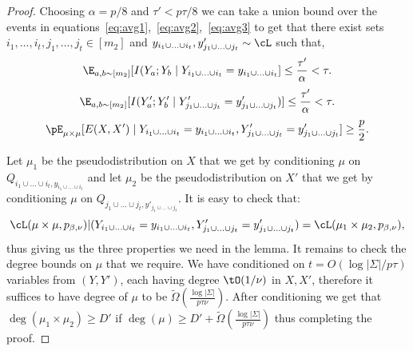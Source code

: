 \begin{proof}
Choosing $\alpha = p/8$ and $\tau' < p\tau/8$ we can take a union bound over the events in equations~\eqref{eq:avg1},~\eqref{eq:avg2},~\eqref{eq:avg3} to get that there exist sets $i_1,\ldots,i_t, j_1,\ldots,j_t \in [m_2]$ and $y_{i_1 \cup \ldots \cup i_t}, y'_{j_1 \cup \ldots \cup j_t} \sim \cL$ such that,   
\[\E_{a,b \sim [m_2]}[I(Y_a ; Y_b \mid Y_{i_1 \cup \ldots \cup i_t} = y_{i_1 \cup \ldots \cup i_t}] \leq \frac{\tau'}{\alpha} < \tau.\]
\[\E_{a,b \sim [m_2]}[I(Y'_a ; Y'_b \mid Y'_{j_1 \cup \ldots \cup j_t} = y'_{j_1 \cup \ldots \cup j_t})] \leq \frac{\tau'}{\alpha} < \tau.
\]
\[\pE_{\mu \times \mu}[E(X,X') \mid Y_{i_1 \cup \ldots \cup i_t} = y_{i_1 \cup \ldots \cup i_t}, Y'_{j_1 \cup \ldots \cup j_t} = y'_{j_1 \cup \ldots \cup j_t}] \geq \frac{p}{2}.\]

Let $\mu_1$ be the pseudodistribution on $X$ that we get by conditioning $\mu$ on $Q_{i_1 \cup \ldots \cup i_t, y_{i_1 \cup \ldots \cup i_t}}$ and let $\mu_2$ be the pseudodistribution on $X'$ that we get by conditioning $\mu$ on $Q_{j_1 \cup \ldots \cup j_t,y'_{j_1 \cup \ldots \cup j_t}}$. It is easy to check that:
\[\cL(\mu \times \mu, p_{\beta,\nu})| (Y_{i_1 \cup \ldots \cup i_t} = y_{i_1 \cup \ldots \cup i_t}, Y'_{j_1 \cup \ldots \cup j_t} = y'_{j_1 \cup \ldots \cup j_t}) = \cL(\mu_1 \times \mu_2, p_{\beta,\nu}),\]
thus giving us the three properties we need in the lemma. It remains to check the degree bounds on $\mu$ that we require. We have conditioned on $t = O(\log |\Sigma|/p\tau)$ variables from $(Y,Y')$, each having degree $\tO(1/\nu)$ in $X,X'$, therefore it suffices to have degree of $\mu$ to be $\widetilde{\Omega}\left(\frac{\log |\Sigma|}{p\tau\nu}\right)$. After conditioning we get that $\deg(\mu_1 \times \mu_2) \geq D'$ if $\deg(\mu) \geq D'+\widetilde{\Omega}\left(\frac{\log |\Sigma|}{p\tau\nu}\right)$ thus completing the proof.
\end{proof}



